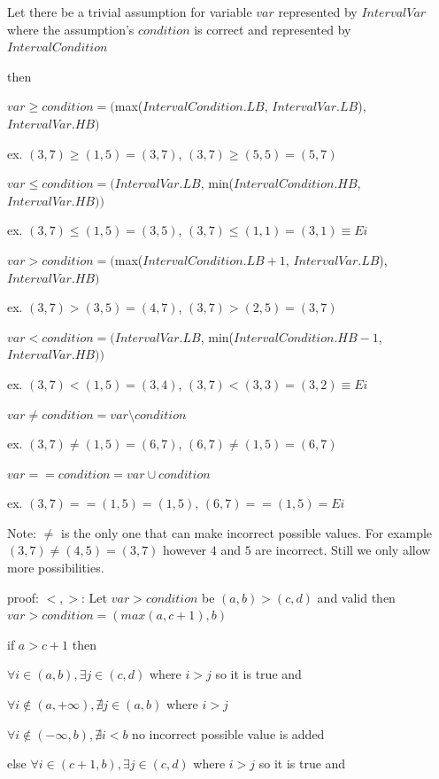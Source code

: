 \begin{theorem}
	Let there be a trivial assumption for variable $var$ represented by $IntervalVar$ where the assumption's $condition$ is correct and represented by $IntervalCondition$
	
	then
	
	$var \geq condition=($max($IntervalCondition.LB$, $IntervalVar.LB$),$IntervalVar.HB)$
	
	ex. $(3, 7) \geq (1,5) = (3,7)$, $(3, 7) \geq (5,5) = (5,7)$
	
	$var \leq condition=(IntervalVar.LB$, min($IntervalCondition.HB$, $IntervalVar.HB))$
	
	ex. $(3, 7) \leq (1,5) = (3,5)$, $(3, 7) \leq (1,1) = (3,1) \equiv Ei$
	
	$var > condition=($max($IntervalCondition.LB+1$, $IntervalVar.LB$),$IntervalVar.HB)$
	
	ex. $(3, 7) > (3,5) = (4,7)$, $(3, 7) > (2,5) = (3,7)$
	
	$var < condition=(IntervalVar.LB$, min($IntervalCondition.HB-1$, $IntervalVar.HB))$
	
	ex. $(3, 7) < (1,5) = (3,4)$, $(3, 7) < (3,3) = (3,2) \equiv Ei$
	
	$var \neq condition=var \setminus condition$
	
	ex.  $(3, 7) \neq (1,5) = (6,7)$, $(6, 7) \neq (1,5) = (6,7)$
	
	$var == condition = var \cup condition$
	
	ex.  $(3, 7) == (1,5) = (1,5)$, $(6, 7) == (1,5) = Ei$
	
	Note: $\neq$ is the only one that can make incorrect possible values. For example $(3, 7) \neq (4,5) = (3,7)$ however $4$ and $5$ are incorrect. Still we only allow more possibilities.
	
\end{theorem}
{proof: } $<, >$: Let $var > condition$ be $(a, b)>(c, d)$ and valid then $var > condition=(max(a, c+1), b)$ 

if $a>c+1$ then

 $\forall i \in (a, b), \exists j \in (c, d)$ where $ i>j$ so it is true and 
 
 $\forall i \notin (a, +\infty), \nexists j \in (a, b)$ where $ i>j$ 
 
 $\forall i \notin (-\infty, b), \nexists  i<b$ no incorrect possible value is added
 
 else  $\forall i \in (c+1, b), \exists j \in (c, d)$ where $ i>j$ so it is true and
 
